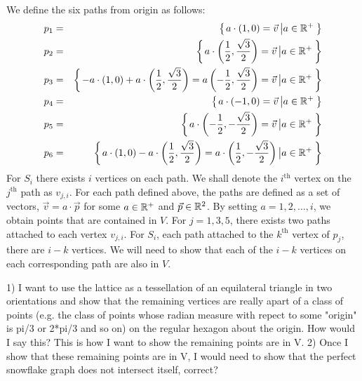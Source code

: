 We define the six paths from origin as follows:
\begin{eqnarray*}
p_1 &=& {\left\lbrace \left. a\cdot\left( 1,0 \right) = \vec{v} \left\vert a \in {\mathbb{R}}^+ \right.\right.\right\rbrace }\\
p_2 &=& {\left\lbrace \left. a\cdot\left( \frac{1}{2},\frac{\sqrt{3}}{2} \right) = \vec{v} \left\vert a \in {\mathbb{R}}^+ \right.\right.\right\rbrace }\\
p_3 &=& {\left\lbrace \left. -a\cdot \left( 1,0 \right) + a \cdot \left( \frac{1}{2},\frac{\sqrt{3}}{2} \right) = a\left( -\frac{1}{2},\frac{\sqrt{3}}{2} \right) = \vec{v} \left\vert a \in {\mathbb{R}}^+ \right.\right.\right\rbrace }\\
p_4 &=& {\left\lbrace \left. a \cdot \left( -1,0 \right) = \vec{v} \left\vert a \in {\mathbb{R}}^+ \right.\right.\right\rbrace }\\
p_5 &=& {\left\lbrace \left. a \cdot \left( -\frac{1}{2},-\frac{\sqrt{3}}{2} \right)  = \vec{v} \left\vert a \in {\mathbb{R}}^+ \right.\right.\right\rbrace }\\
p_6 &=& {\left\lbrace \left.  a\cdot \left( 1,0 \right) - a \cdot \left( \frac{1}{2},\frac{\sqrt{3}}{2} \right)= a \cdot \left( \frac{1}{2}, -\frac{\sqrt{3}}{2} \right) \left\vert a \in {\mathbb{R}}^+ \right.\right.\right\rbrace } 
\end{eqnarray*}
For $S_i$ there exists $i$ vertices on each path.  We shall denote the $i^\text{th}$ vertex on the $j^\text{th}$ path as $v_{j,i}$.  For each path defined above, the paths are defined as a set of vectors, $\vec{v} = a \cdot \vec{p}$  for some $a \in {\mathbb{R}}^+$ and $\vec{p} \in {\mathbb{R}}^2$.  By setting $a = 1,2,\dots, i$, we obtain points that are contained in $V$.  For $j = 1,3,5$, there exists two paths attached to each vertex $v_{j,i}$.  For $S_i$, each path attached to the $k^\text{th}$ vertex of $p_j$, there are $i-k$ vertices.  We will need to show that each of the $i-k$ vertices on each corresponding path are also in $V$.  

1) I want to use the lattice as a tessellation of an equilateral triangle in two orientations and show that the remaining vertices are really apart of a class of points (e.g. the class of points whose radian measure with repect to some "origin" is pi/3 or 2*pi/3 and so on) on the regular hexagon about the origin. How would I say this?  This is how I want to show the remaining points are in V.
2) Once I show that these remaining points are in V, I would need to show that the perfect snowflake graph does not intersect itself, correct?







